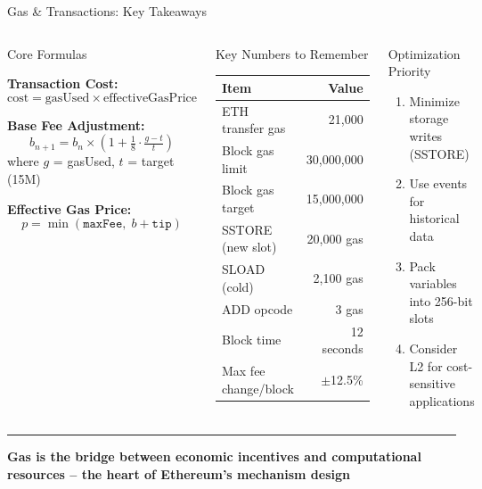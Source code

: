 \documentclass[8pt,aspectratio=169]{beamer}
\newcommand{\bottomnote}[1]{\vfill\vspace{-2mm}\textcolor{mllavender2}{\rule{\textwidth}{0.4pt}}\vspace{1mm}\footnotesize\textbf{#1}}
\begin{document}
\begin{frame}{Gas \& Transactions: Key Takeaways}
\begin{columns}
\begin{block}{Core Formulas}
\small
\colorbox{mlblue!10}{\parbox{0.9\linewidth}{
\textbf{Transaction Cost:}
\[
\text{cost} = \text{gasUsed} \times \text{effectiveGasPrice}
\]
}}
\vspace{2mm}
\colorbox{mlorange!10}{\parbox{0.9\linewidth}{
\textbf{Base Fee Adjustment:}
\[
b_{n+1} = b_n \times \left(1 + \tfrac{1}{8} \cdot \tfrac{g - t}{t}\right)
\]
where $g$ = gasUsed, $t$ = target (15M)
}}
\vspace{2mm}
\colorbox{mlgreen!10}{\parbox{0.9\linewidth}{
\textbf{Effective Gas Price:}
\[
p = \min(\texttt{maxFee},\; b + \texttt{tip})
\]
}}
\end{block}
\begin{block}{Key Numbers to Remember}
\small
\begin{tabular}{@{}lr@{}}
\toprule
\textbf{Item} & \textbf{Value} \\
\midrule
ETH transfer gas & 21,000 \\
Block gas limit & 30,000,000 \\
Block gas target & 15,000,000 \\
SSTORE (new slot) & 20,000 gas \\
SLOAD (cold) & 2,100 gas \\
ADD opcode & 3 gas \\
Block time & 12 seconds \\
Max fee change/block & $\pm$12.5\% \\
\bottomrule
\end{tabular}
\end{block}
\vspace{2mm}
\begin{alertblock}{Optimization Priority}
\small
\begin{enumerate}
  \item Minimize storage writes (SSTORE)
  \item Use events for historical data
  \item Pack variables into 256-bit slots
  \item Consider L2 for cost-sensitive applications
\end{enumerate}
\end{alertblock}
\end{columns}
\bottomnote{Gas is the bridge between economic incentives and computational resources -- the heart of Ethereum's mechanism design}
\end{frame}
\end{document}
